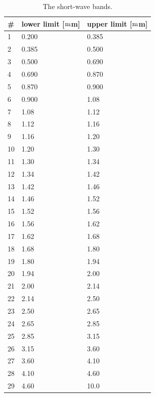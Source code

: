 \documentclass[11pt,numberedappendix,twocolappendix,]{emulateapj}
\begin{document}
\begin{table}
\centering
\caption{The short-wave bands.}
\label{tab:short-wave}
\begin{tabular}{l|l|l} \hline \hline
\# & lower limit [${\rm m}$m] & upper limit [${\rm m}$m] \\ \hline 
    1 &       0.200 &    0.385 \\
    2 &       0.385 &    0.500 \\
    3 &       0.500 &    0.690 \\
    4 &       0.690 &    0.870 \\
    5 &       0.870 &    0.900 \\
    6 &       0.900 &    1.08 \\
    7 &       1.08  &   1.12 \\
    8 &       1.12  &   1.16 \\
    9 &       1.16  &   1.20 \\
   10 &       1.20  &   1.30 \\
   11 &       1.30  &   1.34 \\
   12 &       1.34  &   1.42 \\
   13 &       1.42  &   1.46 \\
   14 &       1.46  &   1.52 \\
   15 &       1.52  &   1.56 \\
   16 &       1.56  &   1.62 \\
   17 &       1.62  &   1.68 \\
   18 &       1.68  &   1.80 \\
   19 &       1.80  &   1.94 \\
   20 &       1.94  &   2.00 \\
   21 &       2.00  &   2.14 \\
   22 &       2.14  &   2.50 \\
   23 &       2.50  &   2.65 \\
   24 &       2.65  &   2.85 \\
   25 &       2.85  &   3.15 \\
   26 &       3.15  &   3.60 \\
   27 &       3.60  &   4.10 \\
   28 &       4.10  &   4.60 \\
   29 &       4.60  &   10.0 \\ \hline
\end{tabular}
\end{table}
\end{document}
